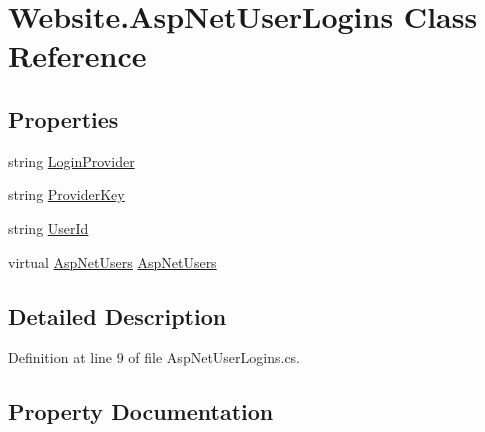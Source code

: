 \hypertarget{class_website_1_1_asp_net_user_logins}{}\section{Website.\+Asp\+Net\+User\+Logins Class Reference}
\label{class_website_1_1_asp_net_user_logins}
\subsection*{Properties}
\begin{DoxyCompactItemize}
\item 
string \hyperlink{class_website_1_1_asp_net_user_logins_a9296aa8ce9fd6aeb888a8efdbc800df3}{Login\+Provider}
\item 
string \hyperlink{class_website_1_1_asp_net_user_logins_a9d0c9f66b1d198bed89016c9ae6fa9ca}{Provider\+Key}
\item 
string \hyperlink{class_website_1_1_asp_net_user_logins_accca4708f6580878d0e8f611d4e7b674}{User\+Id}
\item 
virtual \hyperlink{class_website_1_1_asp_net_users}{Asp\+Net\+Users} \hyperlink{class_website_1_1_asp_net_user_logins_af38e158d8bd634255e0227f741fbd4f0}{Asp\+Net\+Users}
\end{DoxyCompactItemize}


\subsection{Detailed Description}


Definition at line 9 of file Asp\+Net\+User\+Logins.\+cs.



\subsection{Property Documentation}
\hypertarget{class_website_1_1_asp_net_user_logins_af38e158d8bd634255e0227f741fbd4f0}{}
